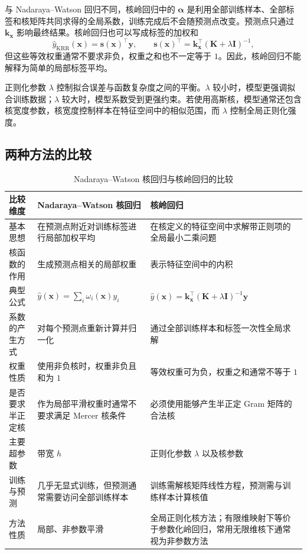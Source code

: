 \documentclass[UTF8,zihao=-4,openany]{ctexbook}
\begin{document}
与 Nadaraya--Watson 回归不同，核岭回归中的 $\boldsymbol\alpha$ 是利用全部训练样本、全部标签和核矩阵共同求得的全局系数，训练完成后不会随预测点改变。预测点只通过 $\boldsymbol k_{\boldsymbol{x}}$ 影响最终结果。核岭回归也可以写成标签的加权和
\[
  \widehat y_{\mathrm{KRR}}(\boldsymbol{x})
  =
  \boldsymbol s(\boldsymbol{x})^\top\boldsymbol y,
  \qquad
  \boldsymbol s(\boldsymbol{x})^\top
  =
  \boldsymbol k_{\boldsymbol{x}}^\top
  (\boldsymbol K+\lambda\boldsymbol I)^{-1},
\]
但这些等效权重通常不要求非负，权重之和也不一定等于 $1$。因此，核岭回归不能解释为简单的局部标签平均。

正则化参数 $\lambda$ 控制拟合误差与函数复杂度之间的平衡。$\lambda$ 较小时，模型更强调拟合训练数据；$\lambda$ 较大时，模型系数受到更强约束。若使用高斯核，模型通常还包含核宽度参数，核宽度控制样本在特征空间中的相似范围，而 $\lambda$ 控制全局正则化强度。

\subsection{两种方法的比较}

\begin{table}[htbp]
  \centering
  \small
  \caption{Nadaraya--Watson 核回归与核岭回归的比较}
  \label{tab:nw-vs-krr-revised}
  \renewcommand{\arraystretch}{1.35}
  \begin{tabular}{
    >{\raggedright\arraybackslash}p{2.7cm}
    >{\raggedright\arraybackslash}p{5.0cm}
    >{\raggedright\arraybackslash}p{5.0cm}}
    \toprule
    比较维度 & Nadaraya--Watson 核回归 & 核岭回归 \\
    \midrule
    基本思想
      & 在预测点附近对训练标签进行局部加权平均
      & 在核定义的特征空间中求解带正则项的全局最小二乘问题 \\
    核函数的作用
      & 生成预测点相关的局部权重
      & 表示特征空间中的内积 \\
    典型公式
      & $\widehat y(\boldsymbol{x})=\sum_i\omega_i(\boldsymbol{x})y_i$
      & $\widehat y(\boldsymbol{x})=\boldsymbol k_{\boldsymbol{x}}^\top(\boldsymbol K+\lambda\boldsymbol I)^{-1}\boldsymbol y$ \\
    系数的产生方式
      & 对每个预测点重新计算并归一化
      & 通过全部训练样本和标签一次性全局求解 \\
    权重性质
      & 使用非负核时，权重非负且和为 $1$
      & 等效权重可为负，权重之和通常不等于 $1$ \\
    是否要求半正定核
      & 作为局部平滑权重时通常不要求满足 Mercer 核条件
      & 必须使用能够产生半正定 Gram 矩阵的合法核 \\
    主要超参数
      & 带宽 $h$
      & 正则化参数 $\lambda$ 以及核参数 \\
    训练与预测
      & 几乎无显式训练，但预测通常需要访问全部训练样本
      & 训练需解核矩阵线性方程，预测需与训练样本计算核值 \\
    方法性质
      & 局部、非参数平滑
      & 全局正则化核方法；有限维映射下等价于参数化岭回归，常用无限维核下通常视为非参数方法 \\
    \bottomrule
  \end{tabular}
\end{table}
\end{document}
